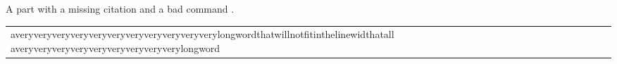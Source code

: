A part with a missing citation \cite{nobody} and a bad command \oops.
\begin{tabular}{l}
averyveryveryveryveryveryveryveryveryveryverylongwordthatwillnotfitinthelinewidthatall averyveryveryveryveryveryveryveryverylongword
\end{tabular}
